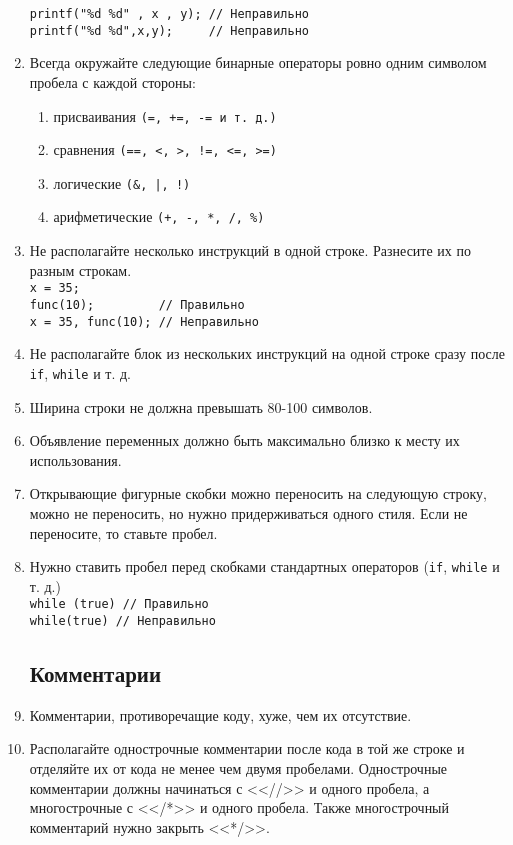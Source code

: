 \documentclass[11pt,a4paper,oneside]{article}
\begin{document}
\begin{enumerate}
\begin{verbatim}
printf("%d %d" , x , y); // Неправильно
printf("%d %d",x,y);     // Неправильно  
          \end{verbatim}
    \item Всегда окружайте следующие бинарные операторы ровно одним символом пробела с каждой стороны:
          \begin{enumerate}
            \item присваивания \texttt{(=, +=, -= и т. д.)}
            \item сравнения \texttt{(==, <, >, !=, <=, >=)}
            \item логические \texttt{(\&, |, !)}
            \item арифметические \texttt{(+, -, *, /, \%)}
          \end{enumerate}              
    \item Не располагайте несколько инструкций в одной строке. Разнесите их по разным строкам.
          \\ \texttt{x = 35;} 
          \\ \texttt{func(10); \hbox{ } \hbox{ } \hbox{ } \hbox{ } // Правильно}
          \\ \texttt{x = 35, func(10); // Неправильно}
    \item Не располагайте блок из нескольких инструкций на одной строке сразу 
          после \texttt{if}, \texttt{while} и т. д.
    \item Ширина строки не должна превышать 80-100 символов.
    \item Объявление переменных должно быть максимально близко к месту их использования.
    \item Открывающие фигурные скобки можно переносить на следующую строку, можно не переносить, но нужно придерживаться одного стиля.
          Если не переносите, то ставьте пробел.
    \item Нужно ставить пробел перед скобками стандартных операторов (\texttt{if}, \texttt{while} и т. д.)
          \\ \texttt{while (true) // Правильно}
          \\ \texttt{while(true) // Неправильно}
        
\subsection*{Комментарии}
    
     \item Комментарии, противоречащие коду, хуже, чем их отсутствие.
     \item Располагайте однострочные комментарии после кода в той же строке и отделяйте
           их от кода не менее чем двумя пробелами. Однострочные комментарии должны начинаться с <<//>> и
           одного пробела, а многострочные с <</*>> и одного пробела. Также многострочный комментарий нужно
           закрыть <<*/>>. 


\end{enumerate}
\end{document}
